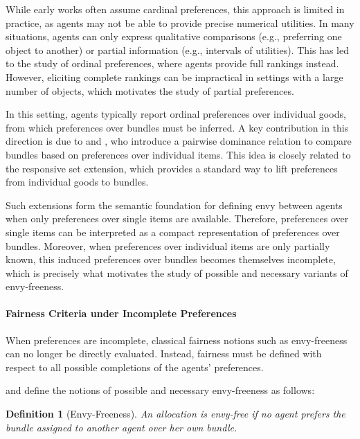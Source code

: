 \documentclass{article}
\newtheorem{definition}{Definition}
\begin{document}
While early works often assume cardinal preferences, this approach is limited in practice, as agents may not be able to provide precise numerical utilities. 
In many situations, agents can only express qualitative comparisons (e.g., preferring one object to another) or partial information (e.g., intervals of utilities).
This has led to the study of ordinal preferences, where agents provide full rankings instead. 
However, eliciting complete rankings can be impractical in settings with a large number of objects, which motivates the study of partial preferences.

In this setting, agents typically report ordinal preferences over individual goods, from which preferences over bundles must be inferred. 
A key contribution in this direction is due to \cite{brams2005efficient} and \cite{brams2003fair}, who introduce a pairwise dominance relation to compare bundles based on preferences over individual items. 
This idea is closely related to the responsive set extension, which provides a standard way to lift preferences from individual goods to bundles. 

Such extensions form the semantic foundation for defining envy between agents when only preferences over single items are available. 
Therefore, preferences over single items can be interpreted as a compact representation of preferences over bundles.
Moreover, when preferences over individual items are only partially known, this induced preferences over bundles becomes themselves incomplete, which is precisely what motivates the study of possible and necessary variants of envy-freeness.

\paragraph{Fairness Criteria under Incomplete Preferences} When preferences are incomplete, classical fairness notions such as envy-freeness can no longer be directly evaluated. 
Instead, fairness must be defined with respect to all possible completions of the agents' preferences.

\cite{bouveret2010fair} and \cite{aziz2024computational} define the notions of possible and necessary envy-freeness as follows:

\begin{definition}[Envy-Freeness]
An allocation is envy-free if no agent prefers the bundle assigned to another agent over her own bundle.
\end{definition}
\end{document}
